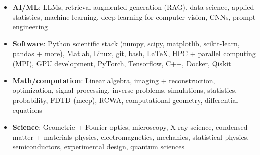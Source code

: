 \begin{itemize}
    \item\textbf{AI/ML}: LLMs, retrieval augmented generation (RAG), data science, applied statistics, machine learning, deep learning for computer vision, CNNs, prompt engineering \par
    \item \textbf{Software}: Python scientific stack (numpy, scipy, matplotlib, scikit-learn, pandas + more), Matlab, Linux, git, bash, \LaTeX, HPC + parallel computing (MPI), GPU development, PyTorch, Tensorflow, C++, Docker, Qiskit \par
    \item \textbf{Math/computation}: Linear algebra, imaging + reconstruction, optimization, signal processing, inverse problems, simulations, statistics, probability, FDTD (meep), RCWA, computational geometry, differential equations \par
    \item \textbf{Science}: Geometric + Fourier optics, microscopy, X-ray science, condensed matter + materials physics, electromagnetics, mechanics, statistical physics, semiconductors, experimental design, quantum sciences \par
\end{itemize}
